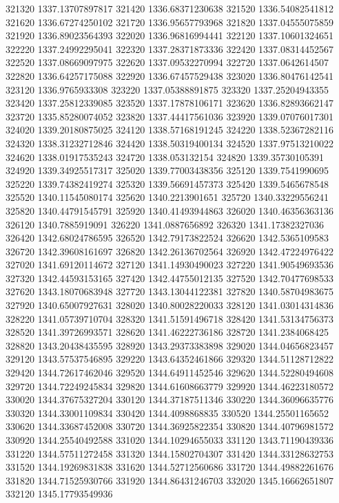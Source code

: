 {321320 1337.13707897817
321420 1336.68371230638
321520 1336.54082541812
321620 1336.67274250102
321720 1336.95657793968
321820 1337.04555075859
321920 1336.89023564393
322020 1336.96816994441
322120 1337.10601324651
322220 1337.24992295041
322320 1337.28371873336
322420 1337.08314452567
322520 1337.08669097975
322620 1337.09532270994
322720 1337.0642614507
322820 1336.64257175088
322920 1336.67457529438
323020 1336.80476142541
323120 1336.9765933308
323220 1337.05388891875
323320 1337.25204943355
323420 1337.25812339085
323520 1337.17878106171
323620 1336.82893662147
323720 1335.85280074052
323820 1337.44417561036
323920 1339.07076017301
324020 1339.20180875025
324120 1338.57168191245
324220 1338.52367282116
324320 1338.31232712846
324420 1338.50319400134
324520 1337.97513210022
324620 1338.01917535243
324720 1338.053132154
324820 1339.35730105391
324920 1339.34925517317
325020 1339.77003438356
325120 1339.7541990695
325220 1339.74382419274
325320 1339.56691457373
325420 1339.5465678548
325520 1340.11545080174
325620 1340.2213901651
325720 1340.33229556241
325820 1340.44791545791
325920 1340.41493944863
326020 1340.46356363136
326120 1340.7885919091
326220 1341.0887656892
326320 1341.17382327036
326420 1342.68024786595
326520 1342.79173822524
326620 1342.5365109583
326720 1342.39608161697
326820 1342.26136702564
326920 1342.47224976422
327020 1341.69120114672
327120 1341.14930490023
327220 1341.90549693536
327320 1342.44593153165
327420 1342.44755012135
327520 1342.70477698533
327620 1343.18070683948
327720 1343.13044122381
327820 1340.58704983675
327920 1340.65007927631
328020 1340.80028220033
328120 1341.03014314836
328220 1341.05739710704
328320 1341.51591496718
328420 1341.53134756373
328520 1341.39726993571
328620 1341.46222736186
328720 1341.2384068425
328820 1343.20438435595
328920 1343.29373383898
329020 1344.04656823457
329120 1343.57537546895
329220 1343.64352461866
329320 1344.51128712822
329420 1344.72617462046
329520 1344.64911452546
329620 1344.52280494608
329720 1344.72249245834
329820 1344.61608663779
329920 1344.46223180572
330020 1344.37675327204
330120 1344.37187511346
330220 1344.36096635776
330320 1344.33001109834
330420 1344.4098868835
330520 1344.25501165652
330620 1344.33687452008
330720 1344.36925822354
330820 1344.40796981572
330920 1344.25540492588
331020 1344.10294655033
331120 1343.71190439336
331220 1344.57511272458
331320 1344.15802704307
331420 1344.33128632753
331520 1344.19269831838
331620 1344.52712560686
331720 1344.49882261676
331820 1344.71525930766
331920 1344.86431246703
332020 1345.16662651807
332120 1345.17793549936
}
